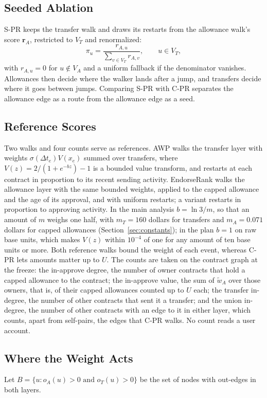 \documentclass{ieeeaccess}
\newcommand{\cpr}{\mbox{C-PR}}
\newcommand{\spr}{\mbox{S-PR}}
\begin{document}
\subsection{Seeded Ablation}
\spr{} keeps the transfer walk and draws its restarts from the allowance walk's score $\mathbf r_A$, restricted to $V_T$ and renormalized:
\begin{equation}
\pi_u=\frac{r_{A,u}}{\sum_{v\in V_T} r_{A,v}},\qquad u\in V_T,
\label{eq:spr}
\end{equation}
with $r_{A,u}=0$ for $u\notin V_A$ and a uniform fallback if the denominator vanishes. Allowances then decide where the walker lands after a jump, and transfers decide where it goes between jumps. Comparing \spr{} with \cpr{} separates the allowance edge as a route from the allowance edge as a seed.

\subsection{Reference Scores}
Two walks and four counts serve as references. AWP \cite{do2023awp} walks the transfer layer with weights $\sigma(\Delta t_e)V(x_e)$ summed over transfers, where $V(z)=2/(1+e^{-bz})-1$ is a bounded value transform, and restarts at each contract in proportion to its recent sending activity. EndorseRank \cite{kwon2026companion} walks the allowance layer with the same bounded weights, applied to the capped allowance and the age of its approval, and with uniform restarts; a variant restarts in proportion to approving activity. In the main analysis $b=\ln 3/m$, so that an amount of $m$ weighs one half, with $m_T=160$ dollars for transfers and $m_A=0.071$ dollars for capped allowances (Section~\ref{sec:constants}); in the plan $b=1$ on raw base units, which makes $V(z)$ within $10^{-4}$ of one for any amount of ten base units or more. Both reference walks bound the weight of each event, whereas \cpr{} lets amounts matter up to $U$. The counts are taken on the contract graph at the freeze: the in-approve degree, the number of owner contracts that hold a capped allowance to the contract; the in-approve value, the sum of $\tilde w_A$ over those owners, that is, of their capped allowances counted up to $U$ each; the transfer in-degree, the number of other contracts that sent it a transfer; and the union in-degree, the number of other contracts with an edge to it in either layer, which counts, apart from self-pairs, the edges that \cpr{} walks. No count reads a user account.

\subsection{Where the Weight Acts}
Let $B=\{u: o_A(u)>0 \text{ and } o_T(u)>0\}$ be the set of nodes with out-edges in both layers.
\end{document}
